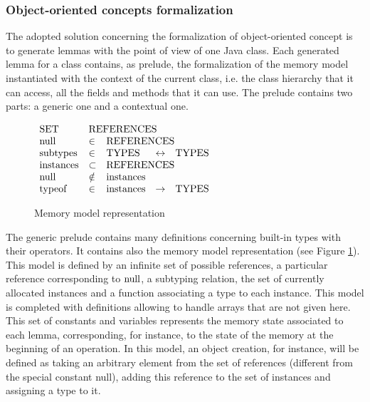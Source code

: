 \subsubsection{Object-oriented concepts formalization}
 The adopted solution concerning the formalization of object-oriented concept is to generate lemmas with the point of
 view of one Java class.
 Each generated lemma for a class contains, as prelude, the formalization of the memory model instantiated with the
context of the current class, i.e. the class hierarchy that it can access, all the fields and methods that it
can use. The prelude contains two parts: a generic one and a contextual one.
 \begin{figure}[thp]
\begin{center}
 $\begin{array}{lllll}
 \rm{SET} & \multicolumn{4}{l}{\rm{REFERENCES}} \\
 \rm{null} & \in & \multicolumn{3}{l}{\rm{REFERENCES}} \\
 \rm{subtypes} & \in & \rm{TYPES} & \leftrightarrow & \rm{TYPES} \\
 \rm{instances} & \subset & \multicolumn{3}{l}{\rm{REFERENCES}} \\
 \rm{null} & \notin & \multicolumn{3}{l}{\rm{instances}} \\
 \rm{typeof} & \in & \rm{instances} & \rightarrow & \rm{TYPES}
 \end{array}$
\end{center}
 \caption{Memory model representation}
 \label{Memory model representation}
\end{figure}

 The generic prelude contains many definitions concerning built-in types with their operators.
 It contains also the memory model representation (see Figure \ref{Memory model representation}). This model is defined
 by an infinite set of possible
 references, a particular reference corresponding to $\rm{null}$, a subtyping relation, the set of currently allocated
instances and a function associating a type to each instance.
 This model is completed with definitions allowing to handle arrays that are not given here.
 This set of constants and variables represents the memory state associated to each lemma, corresponding, for instance, to
the state of the memory at the beginning of an operation.
 In this model, an object creation, for instance, will be defined as taking an
arbitrary element from the set of references (different from the special constant null), adding this reference
to the set of instances and assigning a type to it.

